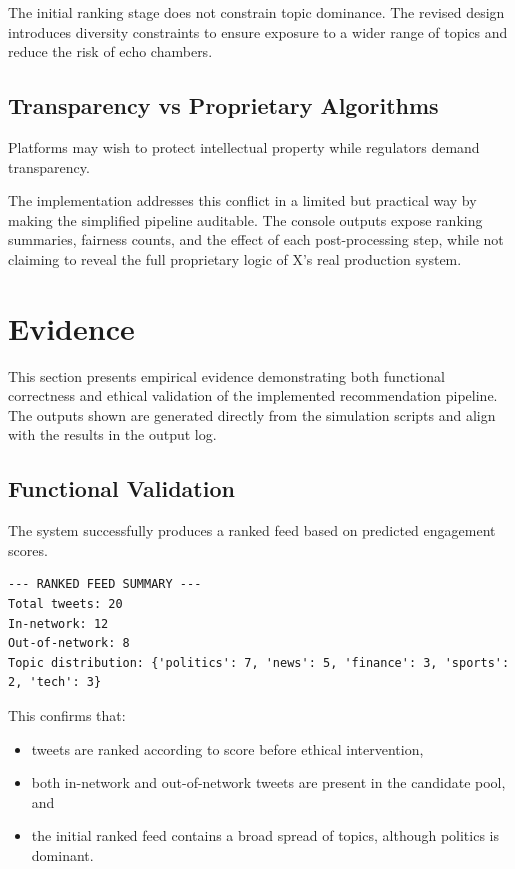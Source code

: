 \documentclass[]
{UCD_CS_41820_Report}
\begin{document}
The initial ranking stage does not constrain topic dominance. The revised design introduces diversity constraints to ensure exposure to a wider range of topics and reduce the risk of echo chambers.

\subsection{Transparency vs Proprietary Algorithms}

Platforms may wish to protect intellectual property while regulators demand transparency.

The implementation addresses this conflict in a limited but practical way by making the simplified pipeline auditable. The console outputs expose ranking summaries, fairness counts, and the effect of each post-processing step, while not claiming to reveal the full proprietary logic of X's real production system.

\section{Evidence}

This section presents empirical evidence demonstrating both functional correctness and ethical validation of the implemented recommendation pipeline. The outputs shown are generated directly from the simulation scripts and align with the results in the output log.

\subsection{Functional Validation}

The system successfully produces a ranked feed based on predicted engagement scores.

\begin{verbatim}
--- RANKED FEED SUMMARY ---
Total tweets: 20
In-network: 12
Out-of-network: 8
Topic distribution: {'politics': 7, 'news': 5, 'finance': 3, 'sports': 2, 'tech': 3}
\end{verbatim}

This confirms that:
\begin{itemize}
    \item tweets are ranked according to score before ethical intervention,
    \item both in-network and out-of-network tweets are present in the candidate pool, and
    \item the initial ranked feed contains a broad spread of topics, although politics is dominant.
\end{itemize}
\end{document}
